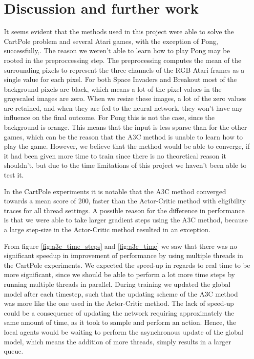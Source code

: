 \documentclass[11pt]{article}
\begin{document}
\section{Discussion and further work}

It seems evident that the methods used in this project were able
to solve the CartPole problem and several Atari games, with the exception of Pong, successfully,.
The reason we weren't able to learn how to play Pong
may be rooted in the preproccessing step.
The preprocessing computes the mean of the surrounding pixels
to represent the three channels of the RGB Atari frames as a single
value for each pixel.
For both Space Invaders and Breakout most of the background pixels are
black, which means a lot of the pixel values in the grayscaled images
are zero.
When we resize these images, a lot of the zero values are retained,
and when they are fed to the neural network, they won't have any
influence on the final outcome.
For Pong this is not the case, since the background is orange.
This means that the input is less sparse than for the other games,
which can be the reason that the A3C method is unable to learn
how to play the game.
However, we believe that the method would be able to converge, if
it had been given more time to train
since there is no theoretical reason it shouldn't,
but due to the time limitations
of this project we haven't been able to test it.

In the CartPole experiments it is notable that the A3C method converged
towards a mean score of 200, faster than the Actor-Critic method with
eligibility traces for all thread settings.
A possible reason for the difference in performance is that we were able to
take larger gradient steps using the A3C method,
because a large step-size in the Actor-Critic method 
resulted in an exception.

From figure \ref{fig:a3c_time_steps} and \ref{fig:a3c_time} we saw 
that there was no significant speedup in improvement of performance by
using multiple threads in the CartPole experiments.
We expected the speed-up in regards to real time to be more significant,
since we should be able to perform a lot more time steps
by running multiple threads in parallel. 
During training we updated the global model after each timestep,
such that the updating scheme of the A3C method was more like the one
used in the Actor-Critic method.
The lack of speed-up could be a consequence of updating the network requiring
approximately the same amount of time, as it took to sample and perform
an action.
Hence, the local agents would be waiting to
perform the asynchronous update of the global model, which means the addition of
more threads, simply results in a larger queue.
\end{document}
